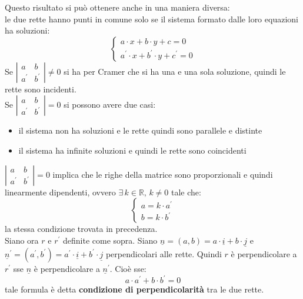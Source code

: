 \documentclass[a4paper,12pt, oneside]{book}
\begin{document}
\newpage
Questo risultato si può ottenere anche in una maniera diversa:\\
le due rette hanno punti in comune solo se il sistema formato dalle loro equazioni ha soluzioni:
$$\begin{cases}
		a\cdot x+b\cdot y+c=0 \\
		a^{'}\cdot x+b^{'}\cdot y+c^{'}=0
	\end{cases}
$$
Se $
	\left|\begin{matrix}
		a     & b     \\
		a^{'} & b^{'}
	\end{matrix}\right|\neq 0
$ si ha per Cramer che si ha una e una sola soluzione, quindi le rette sono incidenti.\\
Se $
	\left|\begin{matrix}
		a     & b     \\
		a^{'} & b^{'}
	\end{matrix}\right|= 0
$ si possono avere due casi:
\begin{itemize}
	\item il sistema non ha soluzioni e le rette quindi sono parallele e distinte
	\item il sistema ha infinite soluzioni e quindi le rette sono coincidenti
\end{itemize}
$
	\left|\begin{matrix}
		a     & b     \\
		a^{'} & b^{'}
	\end{matrix}\right|= 0
$ implica che le righe della matrice sono proporzionali e quindi linearmente dipendenti, ovvero $\exists \, k\in\mathbb{R},\,k\neq 0$ tale che:
$$\begin{cases}
		a=k\cdot a^{'} \\
		b=k\cdot b^{'}
	\end{cases}
$$
la stessa condizione trovata in precedenza.\\
Siano ora $r$ e $r^{'}$ definite come sopra. Siano $\underline{n}=(a,b)=a\cdot \underline{i}+b\cdot\underline{j}$ e $\underline{n}^{'}=(a^{'},b^{'})=a^{'}\cdot \underline{i}+b^{'}\cdot\underline{j}$ perpendicolari alle rette. Quindi $r$ è perpendicolare a $r^{'}$ sse $\underline{n}$ è perpendicolare a $\underline{n}^{'}$. Cioè sse:
$$a\cdot a^{'}+b\cdot b^{'}=0$$
tale formula è detta \textbf{condizione di perpendicolarità} tra le due rette.
\end{document}
